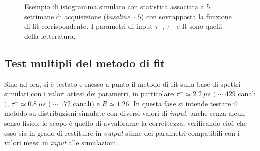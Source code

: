 \documentclass[10pt, oneside, a4paper]{article}   	%
\begin{document}
\begin{figure}[h]
 \centerline{}
 \caption{Esempio di istogramma simulato con statistica associata a 5 settimane di acquisizione (\textit{baseline} $\sim 5$) con sovrapposta la funzione di fit corrispondente. I parametri di input $\tau^+$, $\tau^-$ e R sono quelli della letteratura.}
 \label{fig::esempio_spettro_simulato}
\end{figure}
%
\subsection{Test multipli del metodo di fit}

Sino ad ora, si è testato e messo a punto il metodo di fit sulla base di spettri simulati con i valori attesi dei parametri, in particolare $\tau^+  \simeq 2.2  \ \mu s$ $(\sim 429$ canali$)$, $\tau^- \simeq 0.8 \  \mu s$ $(\sim 172$ canali$)$ e $R\simeq1.26$. 
In questa fase si intende testare il metodo su distribuzioni simulate con diversi valori di \textit{input}, anche senza alcun senso fisico: lo scopo è quello di avvalorarne la correttezza, verificando cioè che esso sia in grado di restituire in \textit{output} stime dei parametri compatibili con i valori messi in \textit{input} alle simulazioni. %
\end{document}
